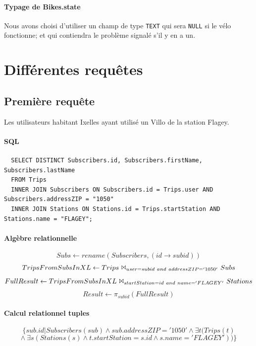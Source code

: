 \documentclass[a4paper]{article}
\begin{document}
  \paragraph{Typage de Bikes.state} Nous avons choisi d'utiliser un champ de type \texttt{TEXT} qui sera \texttt{NULL} si le vélo fonctionne; et qui contiendra le problème signalé s'il y en a un.

\section{Différentes requêtes}



\subsection{Première requête}
    Les utilisateurs habitant Ixelles ayant utilisé un Villo de la station Flagey.

    \paragraph{SQL}
  \begin{verbatim}
  SELECT DISTINCT Subscribers.id, Subscribers.firstName, Subscribers.lastName
  FROM Trips
  INNER JOIN Subscribers ON Subscribers.id = Trips.user AND Subscribers.addressZIP = "1050"
  INNER JOIN Stations ON Stations.id = Trips.startStation AND Stations.name = "FLAGEY";
  \end{verbatim}
  
    \paragraph{Algèbre relationnelle}
    $$ Subs \leftarrow rename(Subscribers, (id \rightarrow subid))$$
    $$TripsFromSubsInXL \leftarrow Trips\ \Bowtie_{user=subid\ and\ addressZIP='1050'}\ Subs$$
    $$FullResult \leftarrow TripsFromSubsInXL\ \Bowtie_{startStation=id\ and\  name='FLAGEY'}\ Stations$$
    $$Result \leftarrow \pi_{subid}(FullResult)$$
    
    \paragraph{Calcul relationnel tuples}
    $$ \{sub.id | Subscribers(sub) \land sub.addressZIP='1050' \land \exists t (Trips(t)$$
    $$ \land\ \exists s (Stations(s) \land t.startStation=s.id \land s.name = 'FLAGEY'))  \} $$
\end{document}
